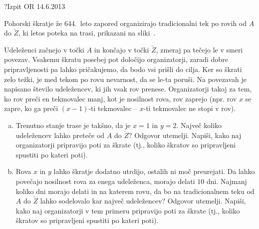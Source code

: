 \begin{naloga}{?}{Izpit OR 14.6.2013}
\begin{vprasanje}[rovi]
Pohorski škratje že 644.~leto zapored
organizirajo tradicionalni tek po rovih od $A$ do $\check{Z}$,
ki letos poteka na trasi, prikazani na sliki~\fig{}.

Udeleženci začnejo v točki $A$ in končajo v točki $\check{Z}$,
zmeraj pa tečejo le v smeri povezav.
Vsakemu škratu posebej pot določijo organizatorji,
zaradi dobre pripravljenosti pa lahko pričakujemo,
da bodo vsi prišli do cilja.
Ker so škrati zelo težki,
je med tekom po rovu nevarnost, da se le-ta poruši.
Na povezavah je napisano število udeležencev, ki jih vsak rov prenese.
Organizatorji takoj za tem, ko rov preči en tekmovalec manj,
kot je nosilnost rova, rov zaprejo
(npr. rov $x$ se zapre, ko ga preči $(x-1)$-ti tekmovalec
-- $x$-ti tekmovalec ne stopi v rov).

\begin{enumerate}[(a)]
\item Trenutno stanje trase je takšno, da je $x = 1$ in $y = 2$.
Največ koliko udeležencev lahko preteče od $A$ do $\check{Z}$?
Odgovor utemelji.
Napiši, kako naj organizatorji pripravijo poti za škrate
(tj., koliko škratov so pripravljeni spustiti po kateri poti).

\item Rova $x$ in $y$ lahko škratje dodatno utrdijo,
ostalih ni moč preurejati.
Da lahko povečajo nosilnost rova za enega udeleženca, morajo delati $10$ dni.
Najmanj koliko dni morajo delati in na katerem rovu,
da bo na tradicionalnem teku od $A$ do $\check{Z}$
lahko sodelovalo kar največ udeležencev?
Odgovor utemelji.
Napiši, kako naj organizatorji v tem primeru pripravijo poti za škrate
(tj., koliko škratov so pripravljeni spustiti po kateri poti).
\end{enumerate}

\begin{slika}
\pgfslika
{}
\end{slika}
\end{vprasanje}
\begin{odgovor}
\end{odgovor}
\end{naloga}
